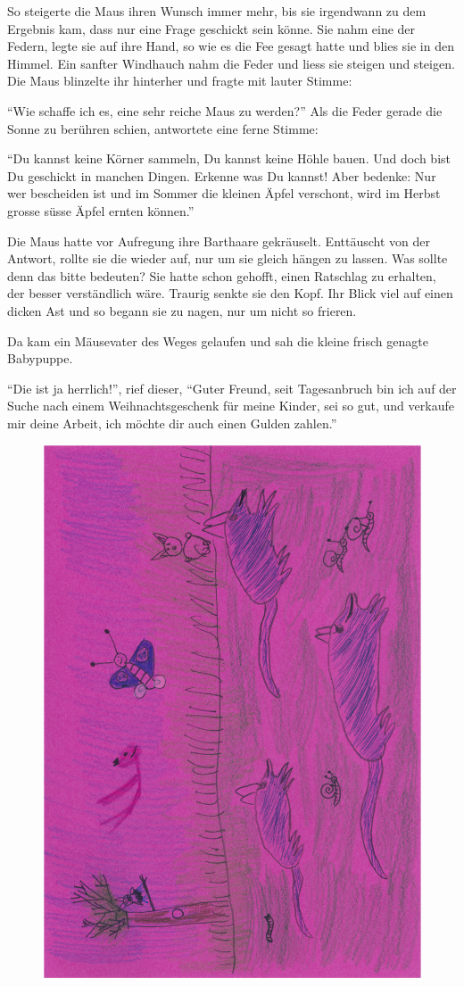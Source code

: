 So steigerte die Maus ihren Wunsch immer mehr, bis sie irgendwann zu dem Ergebnis kam, dass nur eine Frage geschickt sein könne. Sie nahm eine der Federn, legte sie auf ihre Hand, so wie es die Fee gesagt hatte und blies sie in den Himmel. Ein sanfter Windhauch nahm die Feder und liess sie steigen und steigen. Die Maus blinzelte ihr hinterher und fragte mit lauter Stimme: 

\enquote{Wie schaffe ich es, eine sehr reiche Maus zu werden?} Als die Feder gerade die Sonne zu berühren schien, antwortete eine ferne Stimme:

\enquote{Du kannst keine Körner sammeln, Du kannst keine Höhle bauen. Und doch bist Du geschickt in manchen Dingen. Erkenne was Du kannst! Aber bedenke: Nur wer bescheiden ist und im Sommer die kleinen Äpfel verschont, wird im Herbst grosse süsse Äpfel ernten können.} 

Die Maus hatte vor Aufregung ihre Barthaare gekräuselt. Enttäuscht von der Antwort, rollte sie die wieder auf, nur um sie gleich hängen zu lassen. Was sollte denn das bitte bedeuten? Sie hatte schon gehofft, einen Ratschlag zu erhalten, der besser verständlich wäre. Traurig senkte sie den Kopf. Ihr Blick viel auf einen dicken Ast und so begann sie zu nagen, nur um nicht so frieren. 

Da kam ein Mäusevater des Weges gelaufen und sah die kleine frisch genagte Babypuppe. 

\enquote{Die ist ja herrlich!}, rief dieser, \enquote{Guter Freund, seit Tagesanbruch bin ich auf der Suche nach einem Weihnachtsgeschenk für meine Kinder, sei so gut, und verkaufe mir deine Arbeit, ich möchte dir auch einen Gulden zahlen.}

\begin{figure}[hb]
\centering
\includegraphics[width=.8\textwidth]{bilder/maus_1.pdf}
\end{figure}


